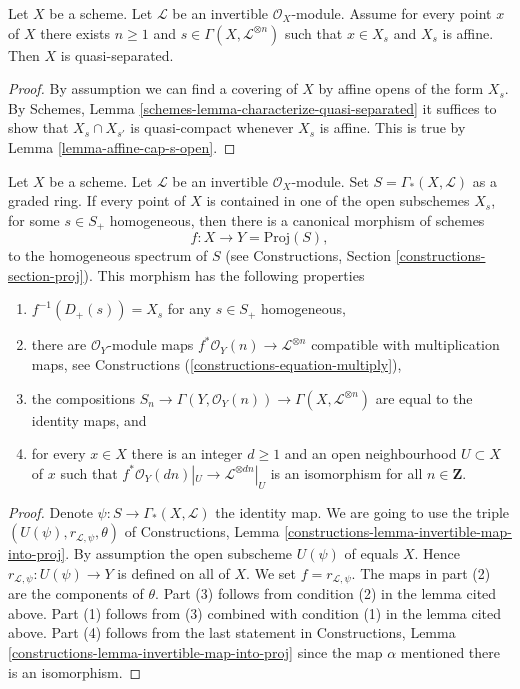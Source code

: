 \begin{lemma}
\label{lemma-affine-s-opens-cover-quasi-separated}
Let $X$ be a scheme. Let $\mathcal{L}$ be an invertible $\mathcal{O}_X$-module.
Assume for every point $x$ of $X$ there exists $n \geq 1$ and
$s \in \Gamma(X, \mathcal{L}^{\otimes n})$ such that
$x \in X_s$ and $X_s$ is affine. Then $X$ is quasi-separated.
\end{lemma}

\begin{proof}
By assumption we can find a covering of $X$ by affine opens of the form $X_s$.
By Schemes, Lemma \ref{schemes-lemma-characterize-quasi-separated}
it suffices to show that $X_s \cap X_{s'}$ is quasi-compact
whenever $X_s$ is affine. This is true by Lemma \ref{lemma-affine-cap-s-open}.
\end{proof}

\begin{lemma}
\label{lemma-map-into-proj}
Let $X$ be a scheme.
Let $\mathcal{L}$ be an invertible $\mathcal{O}_X$-module.
Set $S = \Gamma_*(X, \mathcal{L})$ as a graded ring.
If every point of $X$ is contained in one of the
open subschemes $X_s$, for some $s \in S_{+}$ homogeneous, then
there is a canonical morphism of schemes
$$
f : X \longrightarrow Y = \text{Proj}(S),
$$
to the homogeneous spectrum of $S$ (see
Constructions, Section \ref{constructions-section-proj}).
This morphism has the following properties
\begin{enumerate}
\item $f^{-1}(D_{+}(s)) = X_s$ for any $s \in S_{+}$ homogeneous,
\item there are $\mathcal{O}_Y$-module maps
$f^*\mathcal{O}_Y(n) \to \mathcal{L}^{\otimes n}$
compatible with multiplication maps, see Constructions
(\ref{constructions-equation-multiply}),
\item the compositions
$S_n \to
\Gamma(Y, \mathcal{O}_Y(n)) \to
\Gamma(X, \mathcal{L}^{\otimes n})$
are equal to the identity maps, and
\item for every $x \in X$ there is an integer $d \geq 1$
and an open neighbourhood $U \subset X$ of $x$
such that $f^*\mathcal{O}_Y(dn)|_U \to \mathcal{L}^{\otimes dn}|_U$
is an isomorphism for all $n \in \mathbf{Z}$.
\end{enumerate}
\end{lemma}

\begin{proof}
Denote $\psi : S \to \Gamma_*(X, \mathcal{L})$ the identity map.
We are going to use the triple
$(U(\psi), r_{\mathcal{L}, \psi}, \theta)$ of
Constructions, Lemma \ref{constructions-lemma-invertible-map-into-proj}.
By assumption the open subscheme $U(\psi)$ of equals $X$. Hence
$r_{\mathcal{L}, \psi} : U(\psi) \to Y$ is defined on all of $X$.
We set $f = r_{\mathcal{L}, \psi}$.
The maps in part (2) are the components of $\theta$.
Part (3) follows from condition (2) in the lemma cited above.
Part (1) follows from (3) combined with condition (1) in the lemma
cited above. Part (4) follows from the last statement in
Constructions, Lemma \ref{constructions-lemma-invertible-map-into-proj}
since the map $\alpha$ mentioned there is an isomorphism.
\end{proof}

